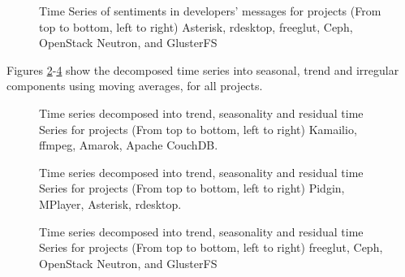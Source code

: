 \documentclass[12pt]{report}
\begin{document}
\begin{figure}[!htbp]
\caption{Time Series of sentiments in developers' messages for projects (From top to bottom, left to right) Asterisk, rdesktop, freeglut, Ceph, OpenStack Neutron, and GlusterFS}
\label{figureTS_7to12}
\end{figure}

Figures \ref{figureDecpmposed_1to4}-\ref{figureDecpmposed_9to12} show the decomposed time series into seasonal, trend and irregular components using moving averages, for all projects. 

\begin{figure}[!htbp]
\caption{Time series decomposed into trend, seasonality and residual time Series for projects (From top to bottom, left to right) Kamailio, ffmpeg, Amarok, Apache CouchDB.}
\label{figureDecpmposed_1to4}
\end{figure}

\begin{figure}[!htbp]
\caption{Time series decomposed into trend, seasonality and residual time Series for projects (From top to bottom, left to right) Pidgin, MPlayer, Asterisk, rdesktop.}
\label{figureDecpmposed_5to8}
\end{figure}

\begin{figure}[!htbp]
\caption{Time series decomposed into trend, seasonality and residual time Series for projects (From top to bottom, left to right) freeglut, Ceph, OpenStack Neutron, and GlusterFS}
\label{figureDecpmposed_9to12}
\end{figure}
\end{document}
